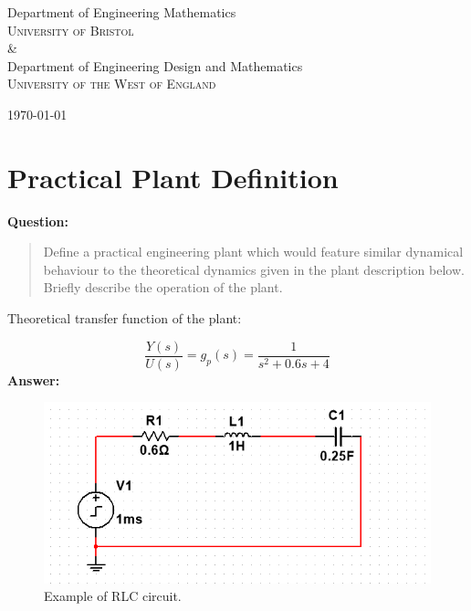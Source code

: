 \documentclass[12pt, oneside]{article}
\begin{document}
\begin{titlepage}
\begin{center}
        \vspace{10mm}
        {\large Department of Engineering Mathematics\\
        \textsc{University of Bristol}}
        \\
        \&
        \\
        {\large Department of Engineering Design and Mathematics\\
        \textsc{University of the West of England}}\\

        \vspace{0.8cm}
 
        \vspace{0.8cm}
        \today
        
    \end{center}
    
\end{titlepage}

\tableofcontents
\pagebreak

\section{Practical Plant Definition}



\textbf{Question:} 
\begin{quote}
Define a practical engineering plant which would feature similar dynamical behaviour to the theoretical dynamics given in the plant description below. Briefly describe the operation of the plant.
\end{quote}

Theoretical transfer function of the plant:

\begin{equation}
    \frac{Y(s)}{U(s)} = g_{p}(s) = \frac{1}{s^{2}+0.6s+4}
\end{equation}
\textbf{Answer:}
\vspace{0.5cm}


\begin{figure}
    \centering
    \includegraphics[width = 0.6\linewidth]{Report/pics/RLC电路例子.png}
    \caption{Example of RLC circuit.}
    \label{fig:RLC circuit example}
\end{figure}
\end{document}
